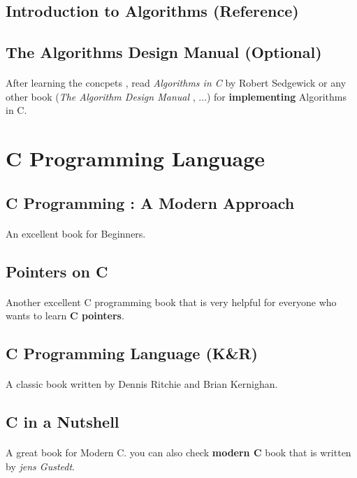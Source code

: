 \documentclass[12pt, a4paper]{article}
\begin{document}
\subsection*{Introduction to Algorithms ({Reference})}
\subsection*{The Algorithms Design Manual (Optional)}
\paragraph{}
After learning the concpets , read \emph{Algorithms in C} by Robert Sedgewick or any other book (\emph{The Algorithm Design Manual} , $\dots$) for \textbf{implementing} Algorithms in C.

\section{C Programming Language}
\subsection*{C Programming : A Modern Approach}
\paragraph{}
An excellent book for Beginners.
\subsection*{Pointers on C}
\paragraph{}
Another excellent C programming book that is very helpful for everyone who wants to learn \textbf{C pointers}.
\subsection*{C Programming Language (K\&R)}
\paragraph{}
A classic book written by Dennis Ritchie and Brian Kernighan.
\subsection*{C in a Nutshell}
\paragraph{}
A great book for Modern C. you can also check \textbf{modern C} book that is written by \emph{jens Gustedt}.
\end{document}
